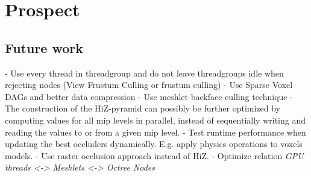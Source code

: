 \chapter{Prospect} \label{cpt-prospect}



\section{Future work}

- Use every thread in threadgroup and do not leave threadgroups idle when rejecting nodes (View Frustum Culling or frustum culling)
- Use Sparse Voxel DAGs and better data compression
- Use meshlet backface culling technique
- The construction of the \ac{HiZ}-pyramid can possibly be further optimized by computing values for all mip levels 
  in parallel, instead of sequentially writing and reading the values to or from a given mip level. 
- Test runtime performance when updating the best occluders dynamically. E.g. apply physics operations to voxels models.
- Use raster occlusion approach \cite{NVIDIAGLOC2016} instead of \ac{HiZ}.
- Optimize relation \emph{GPU threads <-> Meshlets <-> Octree Nodes}